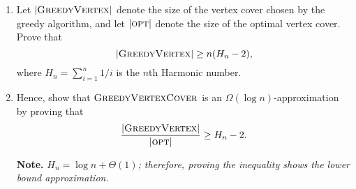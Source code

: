 \documentclass{article}
\begin{document}
\begin{question}
\begin{enumerate}[label = (\alph*)]
    \item Let $\lvert \mathsf{\textsc{GreedyVertex}} \rvert$ denote the size of the vertex cover chosen by the greedy algorithm, and let $\lvert \mathsf{\textsc{opt}}\rvert$ denote the size of the optimal vertex cover. Prove that \[\lvert \mathsf{\textsc{GreedyVertex}} \rvert \geq n(H_n - 2),\] where $H_n = \sum_{i = 1}^n 1/i$ is the $n$th Harmonic number.
    
    \item Hence, show that $\mathsf{\textsc{GreedyVertexCover}}$ is an $\Omega(\log n)$-approximation by proving that \[\frac{\lvert \mathsf{\textsc{GreedyVertex}} \rvert}{\lvert \mathsf{\textsc{opt}} \rvert} \geq H_n - 2.\]

    {\bfseries Note.} {\em $H_n = \log n + \Theta(1)$; therefore, proving the inequality shows the lower bound approximation.}
\end{enumerate}
\end{question}
\end{document}
